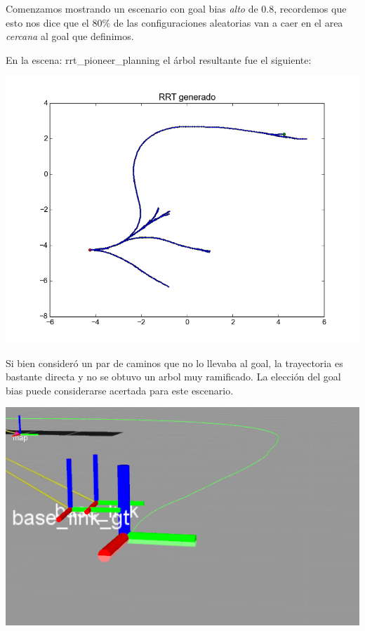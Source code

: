 Comenzamos mostrando un escenario con goal bias \textit{alto} de $0.8$, recordemos que esto nos dice que el $80\%$ de las configuraciones aleatorias van a caer en el area \textit{cercana} al goal que definimos.

En la escena: rrt\_pioneer\_planning el árbol resultante fue el siguiente:

\includegraphics[scale=0.5]{tp4_imagenes/informe_goal_bias_08.png}

Si bien consideró un par de caminos que no lo llevaba al goal, la trayectoria es bastante directa y no se obtuvo un arbol muy ramificado. La elección del goal bias puede considerarse acertada para este escenario.

\includegraphics[scale=0.5]{tp4_imagenes/informe_goal_bias_08_rviz1.png}


